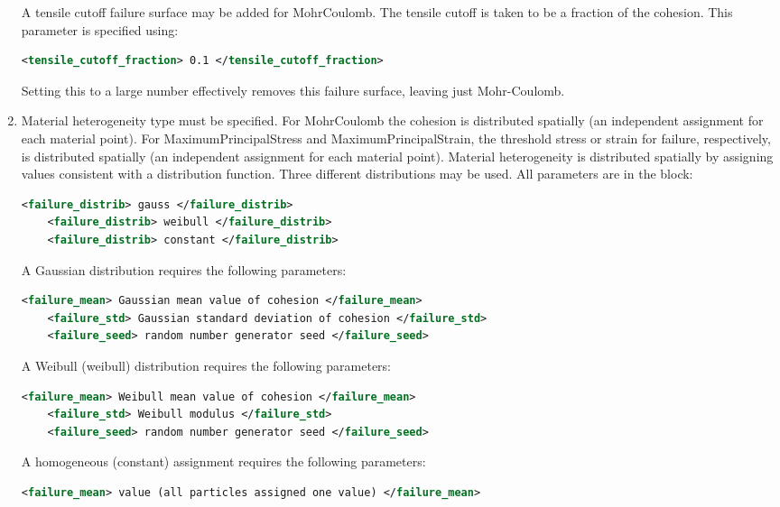 \begin{enumerate}
  A tensile cutoff failure surface may be added for MohrCoulomb.
  The tensile cutoff is taken to be a fraction of the cohesion.  
  This parameter is specified using:
  \begin{lstlisting}[language=XML]
    <tensile_cutoff_fraction> 0.1 </tensile_cutoff_fraction> 
  \end{lstlisting}
  Setting this to a large number effectively removes this failure surface, leaving just Mohr-Coulomb.

\item {}
  Material heterogeneity type must be specified.  For MohrCoulomb the cohesion is distributed 
  spatially (an independent assignment for each material point).  For MaximumPrincipalStress and 
  MaximumPrincipalStrain, the threshold stress or strain for failure, respectively, is distributed 
  spatially (an independent assignment for each material point).  Material heterogeneity is 
  distributed spatially by assigning values consistent with a distribution function.  Three different 
  distributions may be used.  All parameters are in the  block:
  \begin{lstlisting}[language=XML]
    <failure_distrib> gauss </failure_distrib>
    <failure_distrib> weibull </failure_distrib>
    <failure_distrib> constant </failure_distrib>
  \end{lstlisting}

  A Gaussian  distribution requires the following parameters:
  \begin{lstlisting}[language=XML]
    <failure_mean> Gaussian mean value of cohesion </failure_mean>
    <failure_std> Gaussian standard deviation of cohesion </failure_std>
    <failure_seed> random number generator seed </failure_seed>
  \end{lstlisting}

  A Weibull (weibull) distribution requires the following parameters:
  \begin{lstlisting}[language=XML]
    <failure_mean> Weibull mean value of cohesion </failure_mean>
    <failure_std> Weibull modulus </failure_std>
    <failure_seed> random number generator seed </failure_seed>
  \end{lstlisting}

  A homogeneous (constant) assignment requires the following parameters:
  \begin{lstlisting}[language=XML]
    <failure_mean> value (all particles assigned one value) </failure_mean>
  \end{lstlisting}


\end{enumerate}
